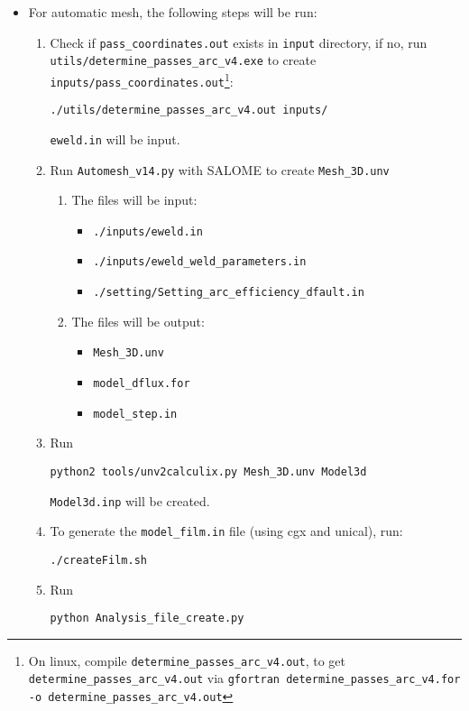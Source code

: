\documentclass[12pt,letterpaper]{article}
\newcommand{\verbStyle}[1]{{\color{SteelBlue40}\colorbox{LightSteelBlue10}{{#1}}}}
\let\OldTexttt\texttt
\renewcommand{\texttt}[1]{\OldTexttt{\verbStyle{#1}}}
\begin{document}
\begin{itemize}
\item For automatic mesh, the following steps will be run:
\begin{enumerate}
\item Check if \texttt{pass\_coordinates.out} exists in \texttt{input} directory, if no, run \\
\texttt{utils/determine\_passes\_arc\_v4.exe} to create \texttt{inputs/pass\_coordinates.out}\footnote{On linux, compile      \texttt{determine\_passes\_arc\_v4.out}, to get \texttt{determine\_passes\_arc\_v4.out} via \texttt{gfortran determine\_passes\_arc\_v4.for -o determine\_passes\_arc\_v4.out}}:
\begin{verbatim}
./utils/determine_passes_arc_v4.out inputs/
\end{verbatim}
\texttt{eweld.in} will be input.
\item Run \texttt{Automesh\_v14.py} with SALOME to create \texttt{Mesh\_3D.unv}
\begin{enumerate}
\item The files will be input:
\begin{itemize}
\item \texttt{./inputs/eweld.in}
\item \texttt{./inputs/eweld\_weld\_parameters.in}
\item \texttt{./setting/Setting\_arc\_efficiency\_dfault.in}
\end{itemize}
\item The files will be output: 
\begin{itemize}
\item \texttt{Mesh\_3D.unv}
\item \texttt{model\_dflux.for}
\item \texttt{model\_step.in}
\end{itemize}
\end{enumerate}
\item Run 
\begin{verbatim}
python2 tools/unv2calculix.py Mesh_3D.unv Model3d
\end{verbatim}
\texttt{Model3d.inp} will be created.
\item To generate the \texttt{model\_film.in} file (using cgx and unical), run:
\begin{verbatim}
./createFilm.sh
\end{verbatim}
\item Run 
\begin{verbatim}
python Analysis_file_create.py
\end{verbatim}
\begin{itemize}

\end{itemize}
\end{enumerate}
\end{itemize}
\end{document}
